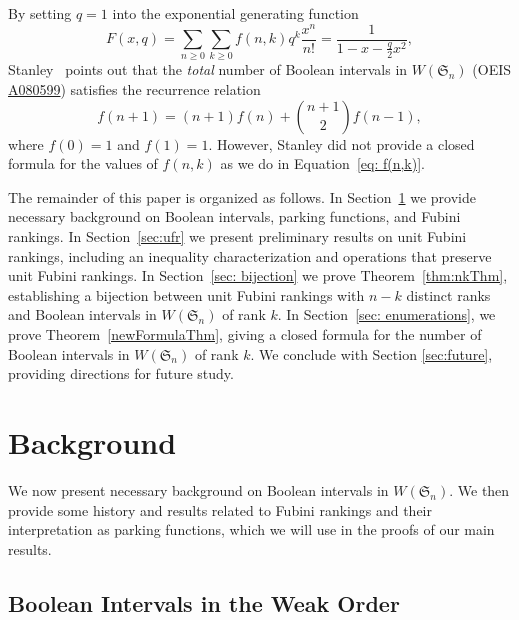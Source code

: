 \documentclass[11pt,reqno]{amsart}
\newcommand{\Sym}{\mathfrak{S}}
\begin{document}
By setting $q=1$ into the exponential generating function \cite[Exercise~3.185(h)]{stanley2012enumerative}
\begin{equation}
    F(x,q) 
    = \sum_{n\geq 0} \sum_{k\geq 0} f(n,k)q^k\frac{x^n}{n!} 
    = \frac{1}{1-x-\frac{q}{2}x^2},
\end{equation}
Stanley~\cite{stanley2016mathoverflow} points out that the \emph{total} number of Boolean intervals in $W(\Sym_n)$ (OEIS \href{https://oeis.org/A080599}{A080599}) satisfies the recurrence relation  
\begin{equation}
    f(n+1) = (n+1)f(n)+\binom{n+1}{2}f(n-1),
\end{equation}
where $f(0)=1$ and $f(1)=1$. 
However, Stanley did not provide a closed formula for the values of $f(n,k)$ as we do in Equation~\eqref{eq: f(n,k)}.



The remainder of this paper is organized as follows. 
In Section~\ref{sec: background} we provide necessary background on Boolean intervals, parking functions, and Fubini rankings.
In Section~\ref{sec:ufr} we present preliminary results on unit Fubini rankings, including an inequality characterization and operations that preserve unit Fubini rankings. 
In Section~\ref{sec: bijection} we prove Theorem~\ref{thm:nkThm}, establishing a bijection between unit Fubini rankings with $n-k$ distinct ranks and Boolean intervals in $W(\Sym_n)$ of rank $k$.
In Section~\ref{sec: enumerations}, we prove Theorem~\ref{newFormulaThm}, giving a closed formula for the number of Boolean intervals in $W(\Sym_n)$ of rank $k$.
We conclude with Section \ref{sec:future}, providing directions for future study.



\section{Background}
\label{sec: background}

We now present necessary background on Boolean intervals in $W(\Sym_n)$. 
We then provide some history and results related to Fubini rankings and their interpretation as parking functions, which we will use in the proofs of our main results.

\subsection{Boolean Intervals in the Weak Order}
\end{document}
